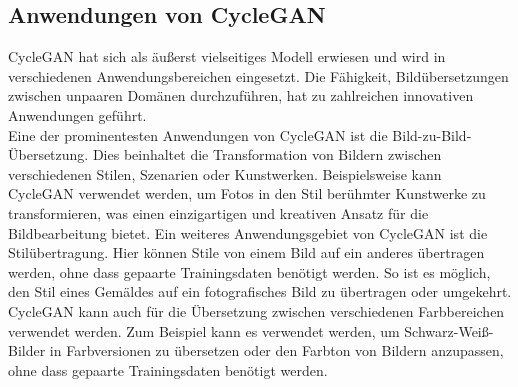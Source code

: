 \subsection{Anwendungen von CycleGAN}
CycleGAN hat sich als äußerst vielseitiges Modell erwiesen und wird in verschiedenen Anwendungsbereichen eingesetzt. Die Fähigkeit, Bildübersetzungen zwischen unpaaren Domänen durchzuführen, hat zu zahlreichen innovativen Anwendungen geführt.
\\
Eine der prominentesten Anwendungen von CycleGAN ist die Bild-zu-Bild-Übersetzung. Dies beinhaltet die Transformation von Bildern zwischen verschiedenen Stilen, Szenarien oder Kunstwerken. Beispielsweise kann CycleGAN verwendet werden, um Fotos in den Stil berühmter Kunstwerke zu transformieren, was einen einzigartigen und kreativen Ansatz für die Bildbearbeitung bietet.
Ein weiteres Anwendungsgebiet von CycleGAN ist die Stilübertragung. Hier können Stile von einem Bild auf ein anderes übertragen werden, ohne dass gepaarte Trainingsdaten benötigt werden. So ist es möglich, den Stil eines Gemäldes auf ein fotografisches Bild zu übertragen oder umgekehrt. CycleGAN kann auch für die Übersetzung zwischen verschiedenen Farbbereichen verwendet werden. Zum Beispiel kann es verwendet werden, um Schwarz-Weiß-Bilder in Farbversionen zu übersetzen oder den Farbton von Bildern anzupassen, ohne dass gepaarte Trainingsdaten benötigt werden.
